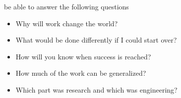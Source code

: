 be able to answer the following questions
\begin{itemize}
    \item Why will work change the world?
    \item What would be done differently if I could start over?
    \item How will you know when success is reached?
    \item How much of the work can be generalized?
    \item Which part was research and which was engineering?
\end{itemize}
